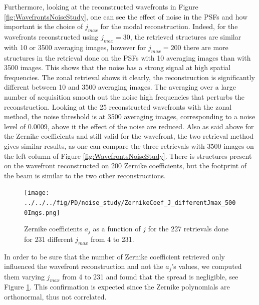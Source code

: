 Furthermore, looking at the reconstructed wavefronts in Figure \ref{fig:WavefrontsNoiseStudy}, one can see the effect of noise in the PSFs and how important is the choice of $j_{max}$ for the modal reconstruction. Indeed, for the wavefronts reconstructed using $j_{max}=30$, the retrieved structures are similar with 10 or 3500 averaging images, however for $j_{max}=200$ there are more structures in the retrieval done on the PSFs with 10 averaging images than with 3500 images. This shows that the noise has a strong signal at high spatial frequencies. The zonal retrieval shows it clearly, the reconstruction is significantly different between 10 and 3500 averaging images. The averaging over a large number of acquisition smooth out the noise high frequencies that perturbs the reconstruction. Looking at the 25 reconstructed wavefronts with the zonal method, the noise threshold is at 3500 averaging images, corresponding to a noise level of 0.0009, above it the effect of the noise are reduced. Also as said above for the Zernike coefficients and still valid for the wavefront, the two retrieval method gives similar results, as one can compare the three retrievals with 3500 images on the left column of Figure \ref{fig:WavefrontsNoiseStudy}. There is structures present on the wavefront reconstructed on 200 Zernike coefficients, but the footprint of the beam is similar to the two other reconstructions.


\begin{figure}
\begin{center}
\texttt{[image: ../../../fig/PD/noise\_study/ZernikeCoef\_J\_differentJmax\_5000Imgs.png]}
\decoRule
\caption{Zernike coefficients $a_j$ as a function of $j$ for the 227 retrievals done for 231 different $j_{max}$ from 4 to 231.}
\label{fig:ZernikeCoef_J_differentJmax_5000Imgs}
\end{center}
\end{figure}

In order to be sure that the number of Zernike coefficient retrieved only influenced the wavefront reconstruction and not the $a_j$'s values, we computed them varying $j_{max}$ from 4 to 231 and found that the spread is negligible, see Figure \ref{fig:ZernikeCoef_J_differentJmax_5000Imgs}. This confirmation is expected since the Zernike polynomials are orthonormal, thus not correlated.

